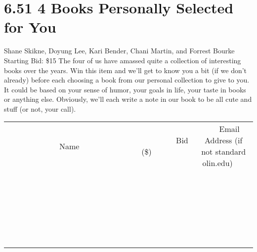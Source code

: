 \documentclass[11pt]{article}
\begin{document}
\section*{6.51 4 Books Personally Selected for You}
Shane Skikne, Doyung Lee, Kari Bender, Chani Martin, and Forrest Bourke
\\
Starting Bid: \$15
\newline
The four of us have amassed quite a collection of interesting books over the years. Win this item and we'll get to know you a bit (if we don't already) before each choosing a book from our personal collection to give to you. It could be based on your sense of humor, your goals in life, your taste in books or anything else.  Obviously, we'll each write a note in our book to be all cute and stuff (or not, your call).
\\[6ex]
\begin{tabular}{c c c}
~~~~~~~~~~~~~Name~~~~~~~~~~~~~ & ~~~~~~~~~Bid (\$)~~~~~~~~~  & ~~~Email Address (if not standard olin.edu)~~~\\
 & & \\
\hline
 & & \\
\hline
 & & \\
\hline
 & & \\
\hline
 & & \\
\hline
 & & \\
\hline
 & & \\
\hline
 & & \\
\hline
 & & \\
\hline
 & & \\
\hline
 & & \\
\hline
 & & \\
\hline
 & & \\
\hline
 & & \\
\hline
 & & \\
\hline
 & & \\
\hline
 & & \\
\hline
 & & \\
\hline
 & & \\
\hline
 & & \\
\hline
 & & \\
\hline
 & & \\
\hline
 & & \\
\hline
 & & \\
\hline
 & & \\
\hline
 & & \\
\hline
\end{tabular}
\newpage
\end{document}
